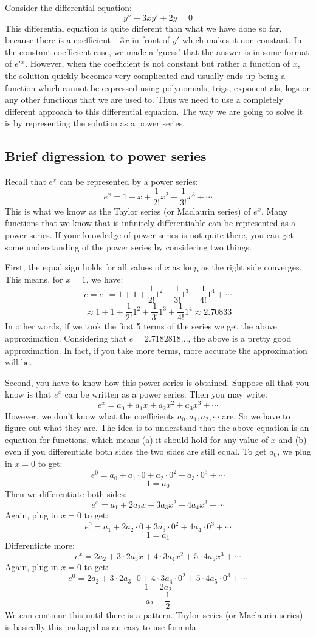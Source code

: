\documentclass[12pt]{report}
\begin{document}
Consider the differential equation:
$$y'' - 3xy'+2y=0$$
This differential equation is quite different than what we have done so far, because there is a coefficient $-3x$ in front of $y'$ which makes it non-constant.
In the constant coefficient case, we made a 'guess' that the answer is in some format of $e^{rx}$. However, when the coefficient is not constant but rather a function of $x$, the solution quickly becomes very complicated and usually ends up being a function which cannot be expressed using polynomials, trigs, exponentials, logs or any other functions that we are used to.
Thus we need to use a completely different approach to this differential equation. The way we are going to solve it is by representing the solution as a power series.

\subsection*{Brief digression to power series}
Recall that $e^x$ can be represented by a power series:
$$e^x = 1 + x + \frac{1}{2!} x^2 + \frac{1}{3!} x^3 +\cdots$$
This is what we know as the Taylor series (or Maclaurin series) of $e^x$. Many functions that we know that is infinitely differentiable can be represented as a power series.
If your knowledge of power series is not quite there, you can get some understanding of the power series by considering two things.

First, the equal sign holds for all values of $x$ as long as the right side converges. This means, for $x=1$, we have:
$$e=e^1=1 + 1 + \frac{1}{2!} 1^2 + \frac{1}{3!} 1^3 + \frac{1}{4!} 1^4+\cdots$$
$$ \approx  1 + 1 + \frac{1}{2!} 1^2 + \frac{1}{3!} 1^3 + \frac{1}{4!} 1^4 \approx 2.70833$$
In other words, if we took the first 5 terms of the series we get the above approximation. Considering that $e=2.7182818...$, the above is a pretty good approximation. In fact, if you take more terms, more accurate the approximation will be.

Second, you have to know how this power series is obtained. Suppose all that you know is that $e^x$ can be written as a power series. Then you may write:
$$e^x = a_0 + a_1 x + a_2 x^2 +a_3 x^3 +\cdots$$
However, we don't know what the coefficients $a_0, a_1, a_2, \cdots $ are. So we have to figure out what they are. The idea is to understand that the above equation is an equation for functions, which means (a) it should hold for any value of $x$ and (b) even if you differentiate both sides the two sides are still equal. To get $a_0$, we plug in $x=0$ to get:
$$e^0 = a_0 + a_1 \cdot 0 + a_2 \cdot 0^2 +a_3 \cdot 0^3 +\cdots $$
$$1 = a_0$$
Then we differentiate both sides:
$$e^x = a_1  + 2 a_2 x + 3a_3 x^2 + 4a_4 x^3 +\cdots$$
Again, plug in $x=0$ to get:
$$e^0 = a_1  + 2 a_2 \cdot 0 + 3a_3 \cdot 0^2 + 4a_4 \cdot 0^3 +\cdots$$
$$1 = a_1$$
Differentiate more:
$$e^x = 2 a_2  + 3\cdot 2 a_3 x + 4\cdot 3a_4 x^2 + 5\cdot 4a_5 x^3+\cdots$$
Again, plug in $x=0$ to get:
$$e^0 = 2 a_2  + 3\cdot 2 a_3 \cdot 0 + 4\cdot 3a_4 \cdot 0^2 + 5\cdot 4a_5 \cdot 0^3+\cdots$$
$$1 = 2 a_2$$
$$a_2 = \frac{1}{2}$$
We can continue this until there is a pattern. Taylor series (or Maclaurin series) is basically this packaged as an easy-to-use formula.
\end{document}
